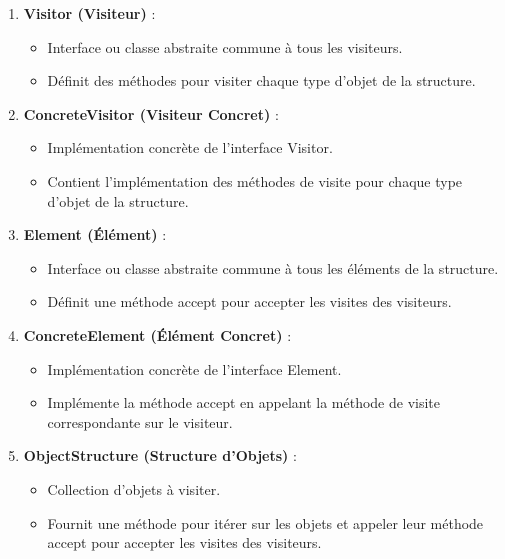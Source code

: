 \documentclass[french]{article}
\begin{document}
\begin{enumerate}
    \item \textbf{Visitor (Visiteur)} :
    \begin{itemize}
        \item Interface ou classe abstraite commune à tous les visiteurs.
        \item Définit des méthodes pour visiter chaque type d'objet de la structure.
    \end{itemize}
    
    \item \textbf{ConcreteVisitor (Visiteur Concret)} :
    \begin{itemize}
        \item Implémentation concrète de l'interface Visitor.
        \item Contient l'implémentation des méthodes de visite pour chaque type d'objet de la structure.
    \end{itemize}
    
    \item \textbf{Element (Élément)} :
    \begin{itemize}
        \item Interface ou classe abstraite commune à tous les éléments de la structure.
        \item Définit une méthode accept pour accepter les visites des visiteurs.
    \end{itemize}
    
    \item \textbf{ConcreteElement (Élément Concret)} :
    \begin{itemize}
        \item Implémentation concrète de l'interface Element.
        \item Implémente la méthode accept en appelant la méthode de visite correspondante sur le visiteur.
    \end{itemize}
    
    \item \textbf{ObjectStructure (Structure d'Objets)} :
    \begin{itemize}
        \item Collection d'objets à visiter.
        \item Fournit une méthode pour itérer sur les objets et appeler leur méthode accept pour accepter les visites des visiteurs.
    \end{itemize}
\end{enumerate}
\end{document}
